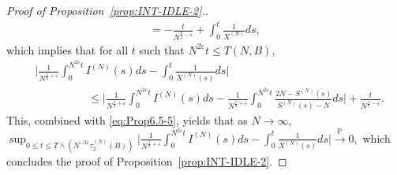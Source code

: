 \documentclass[11pt, reqno]{article}
\numberwithin{equation}{section}
\numberwithin{theorem}{section}
\newcommand{\pto}{\ensuremath{\xrightarrow{\ \mathbb{P}\ }}}  %
\begin{document}
\begin{proof}[Proof of Proposition~\ref{prop:INT-IDLE-2}.]
\begin{align*}
    =-\frac{t}{N^{\frac{1}{2}-\varepsilon}}+\int_0^t\frac{1}{X^{(N)}}ds,
\end{align*}
which implies that for all $t$ such that $N^{2\varepsilon}t\leq T(N,B)$,
\begin{align*}
    &\Big|\frac{1}{N^{\frac{1}{2}+\varepsilon}} \int_0^{N^{2\varepsilon}t} I^{(N)}(s)ds-\int_0^t\frac{1}{X^{(N)}(s)}ds\Big|\\
    &\hspace{2cm}\leq \Big|\frac{1}{N^{\frac{1}{2}+\varepsilon}} \int_0^{N^{2\varepsilon}t} I^{(N)}(s)ds-\frac{1}{N^{\frac{1}{2}+\varepsilon}}\int_0^{N^{2\varepsilon}t}\frac{2N-S^{(N)}(s)}{S^{(N)}(s)-N}ds\Big| + \frac{t}{N^{\frac{1}{2}-\varepsilon}}.
\end{align*}
This, combined with \eqref{eq:Prop6.5-5}, yields that as $N\to\infty$,
$\sup_{0\leq t\leq T \wedge (N^{-2\varepsilon}\tau^{(N)}_2(B))}\Big|\frac{1}{N^{\frac{1}{2}+\varepsilon}}\int_0^{N^{2\varepsilon}t}I^{(N)}(s)ds-\int_0^t \frac{1}{X^{(N)}(s)}ds\Big|\pto 0,$
which concludes the proof of Proposition~\ref{prop:INT-IDLE-2}.
\end{proof}
\end{document}
